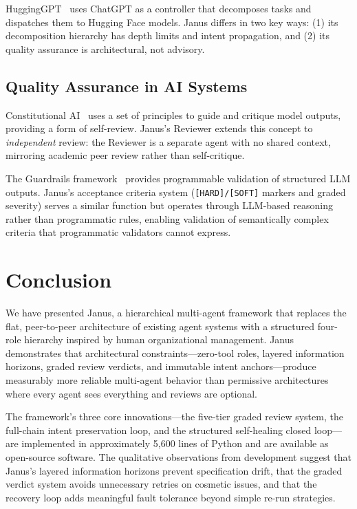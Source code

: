 \documentclass[11pt,a4paper]{article}
\begin{document}
HuggingGPT~\cite{hugginggpt} uses ChatGPT as a controller that decomposes
tasks and dispatches them to Hugging Face models. Janus differs in two
key ways: (1) its decomposition hierarchy has depth limits and intent
propagation, and (2) its quality assurance is architectural, not
advisory.

\subsection{Quality Assurance in AI Systems}

Constitutional AI~\cite{cai} uses a set of principles to guide and
critique model outputs, providing a form of self-review. Janus's Reviewer
extends this concept to \emph{independent} review: the Reviewer is a
separate agent with no shared context, mirroring academic peer review
rather than self-critique.

The Guardrails framework~\cite{guardrails} provides programmable validation
of structured LLM outputs. Janus's acceptance criteria system
(\texttt{[HARD]/[SOFT]} markers and graded severity) serves a similar
function but operates through LLM-based reasoning rather than
programmatic rules, enabling validation of semantically complex criteria
that programmatic validators cannot express.

\section{Conclusion}

We have presented Janus, a hierarchical multi-agent framework that replaces
the flat, peer-to-peer architecture of existing agent systems with a
structured four-role hierarchy inspired by human organizational management.
Janus demonstrates that architectural constraints---zero-tool roles, layered
information horizons, graded review verdicts, and immutable intent
anchors---produce measurably more reliable multi-agent behavior than
permissive architectures where every agent sees everything and reviews
are optional.

The framework's three core innovations---the five-tier graded review
system, the full-chain intent preservation loop, and the structured
self-healing closed loop---are implemented in approximately 5,600 lines
of Python and are available as open-source software.
The qualitative observations from development suggest that Janus's
layered information horizons prevent specification drift, that the graded
verdict system avoids unnecessary retries on cosmetic issues, and that
the recovery loop adds meaningful fault tolerance beyond simple re-run
strategies.
\end{document}
